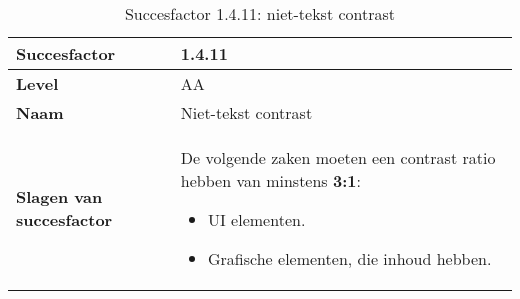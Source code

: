 \begin{table}[H]
    \centering
    \caption{Succesfactor 1.4.11: niet-tekst contrast}

        
        \hspace*{-1cm}\begin{tabular}{|l|p{12cm}|} 
            \hline
            \textbf{Succesfactor}                 & 1.4.11                                                                                                                                                                                                                                                                                                                                                                                                                                                                                                          \\ 
            \hline
            \textbf{Level}                        & AA                                                                                                                                                                                                                                                                                                                                                                                                                                                                                                                 \\ 
            \hline
            \textbf{Naam}                         & Niet-tekst contrast~                                                                                                                                                                                                                                                                                                                                                                                                                                                                                      \\ 
            \hline
            \textbf{Slagen van succesfactor}      & De volgende zaken moeten een contrast ratio hebben van minstens \textbf{3:1}: \begin{itemize}
                \item UI elementen.
                 \item Grafische elementen, die inhoud hebben.
            \end{itemize}                                                                                                                                                                                  \\ 

\end{tabular}
\end{table}
